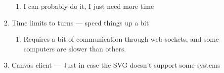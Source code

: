 \documentclass[11pt]{article}
\begin{document}
\begin{enumerate}
\begin{enumerate}
\begin{enumerate}
\item I can probably do it, I just need more time
\end{enumerate}
\item Time limits to turns --- speed things up a bit
\begin{enumerate}
\item Requires a bit of communication through web sockets, and some computers are slower than others.
\end{enumerate}
\item Canvas client --- Just in case the SVG doesn't support some systems
\end{enumerate}
\end{enumerate}
\end{document}
